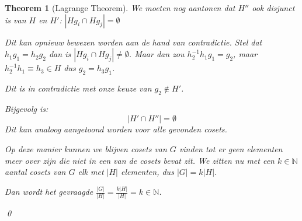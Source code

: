 \documentclass[a4paper,twoside]{article}
\theoremstyle{definition}
\theoremstyle{plain}
\newtheorem{theorem}{Theorem}
\begin{document}
\begin{theorem}[Lagrange Theorem]
    We moeten nog aantonen dat \(H''\) ook disjunct is van \(H\) en \(H'\): \(|Hg_i \cap Hg_j| = \emptyset\)

    Dit kan opnieuw bewezen worden aan de hand van contradictie. Stel dat \(h_1g_1 = h_2g_2 \) dan is \(|Hg_i \cap Hg_j| \neq \emptyset\).
    Maar dan zou \(h_2^{-1}h_1g_1 = g_2\), maar \(h_2^{-1}h_1 \equiv h_3 \in H\) dus \(g_2 = h_3g_1 \).

    Dit is in contradictie met onze keuze van \(g_2 \notin H'\).

    Bijgevolg is:
    \[
    |H' \cap H''| = \emptyset
    \]
    Dit kan analoog aangetoond worden voor alle gevonden cosets.

    Op deze manier kunnen we blijven cosets van \(G\) vinden tot er geen elementen meer over zijn die niet in een van de cosets bevat zit. We zitten nu met een \(k \in \mathbb{N}\) aantal cosets van \(G\)
    elk met \(|H|\) elementen, dus \(|G| = k|H|\).

    Dan wordt het gevraagde \(\frac{|G|}{|H|} = \frac{k |H| }{|H|} = k \in \mathbb{N}\).

    \qed
\end{theorem}
\end{document}
